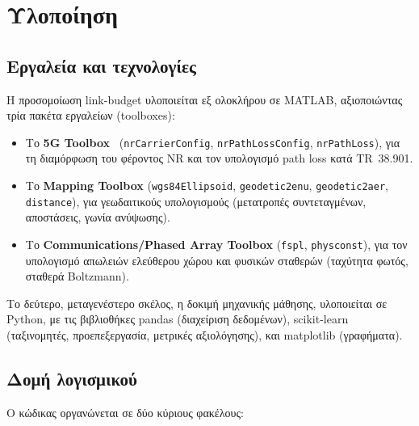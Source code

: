 \chapter{Υλοποίηση}
\label{ch:implementation}

\section{Εργαλεία και τεχνολογίες}
\label{sec:impl-tools}

Η προσομοίωση link-budget υλοποιείται εξ ολοκλήρου σε MATLAB, αξιοποιώντας
τρία πακέτα εργαλείων (toolboxes):

\begin{itemize}
  \item Το \textbf{5G Toolbox}~\cite{matlab5gtoolbox} (\texttt{nrCarrierConfig},
    \texttt{nrPathLossConfig}, \texttt{nrPathLoss}), για τη διαμόρφωση του
    φέροντος NR και τον υπολογισμό path loss κατά TR~38.901.
  \item Το \textbf{Mapping Toolbox} (\texttt{wgs84Ellipsoid},
    \texttt{geodetic2enu}, \texttt{geodetic2aer}, \texttt{distance}), για
    γεωδαιτικούς υπολογισμούς (μετατροπές συντεταγμένων, αποστάσεις, γωνία
    ανύψωσης).
  \item Το \textbf{Communications/Phased Array Toolbox}
    (\texttt{fspl}, \texttt{physconst}), για τον υπολογισμό απωλειών
    ελεύθερου χώρου και φυσικών σταθερών (ταχύτητα φωτός, σταθερά Boltzmann).
\end{itemize}

Το δεύτερο, μεταγενέστερο σκέλος, η δοκιμή μηχανικής μάθησης, υλοποιείται
σε Python, με τις βιβλιοθήκες pandas (διαχείριση δεδομένων),
scikit-learn~\cite{pedregosa2011sklearn} (ταξινομητές, προεπεξεργασία,
μετρικές αξιολόγησης), και matplotlib (γραφήματα).

\section{Δομή λογισμικού}
\label{sec:impl-structure}

Ο κώδικας οργανώνεται σε δύο κύριους φακέλους:


